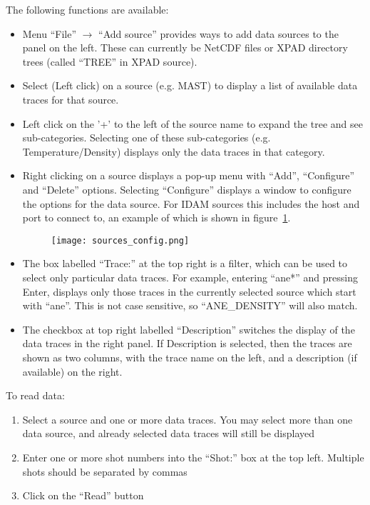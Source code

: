 \documentclass[12pt, a4paper]{article}
\begin{document}
The following functions are available:
\begin{itemize}
\item Menu ``File'' $\rightarrow$ ``Add source'' provides ways to add data sources to the panel on the left. These can currently be NetCDF files or XPAD directory trees (called ``TREE'' in XPAD source).
\item Select (Left click) on a source (e.g. MAST) to display a list of available data traces for that source.
\item Left click on the '+' to the left of the source name to expand the tree and see sub-categories. Selecting one of these sub-categories (e.g. Temperature/Density) displays only the data traces in that category.
\item Right clicking on a source displays a pop-up menu with ``Add'', ``Configure'' and ``Delete'' options. Selecting ``Configure'' displays a window to configure the options for the data source. For IDAM sources this includes the host and port to connect to, an example of which
is shown in figure~\ref{fig:sources_config}.
\begin{figure}[h!]
  \centering
  \texttt{[image: sources\_config.png]}
  \caption{}
  \label{fig:sources_config}
\end{figure}
\item The box labelled ``Trace:'' at the top right is a filter, which can be used to select only particular data traces. For example, entering ``ane*'' and pressing Enter, displays only those traces in the currently selected source which start with ``ane''. This is not case sensitive, so ``ANE\_DENSITY'' will also match.
\item The checkbox at top right labelled ``Description'' switches the display of the data traces in the right panel. If Description is selected, then the traces are shown as two columns, with the trace name on the left, and a description (if available) on the right.
\end{itemize}

To read data:
\begin{enumerate}
\item Select a source and one or more data traces. You may select more than one data source, and already selected data traces will still be displayed
\item Enter one or more shot numbers into the ``Shot:'' box at the top left. Multiple shots should be separated by commas
\item Click on the ``Read'' button
\end{enumerate}
\end{document}
